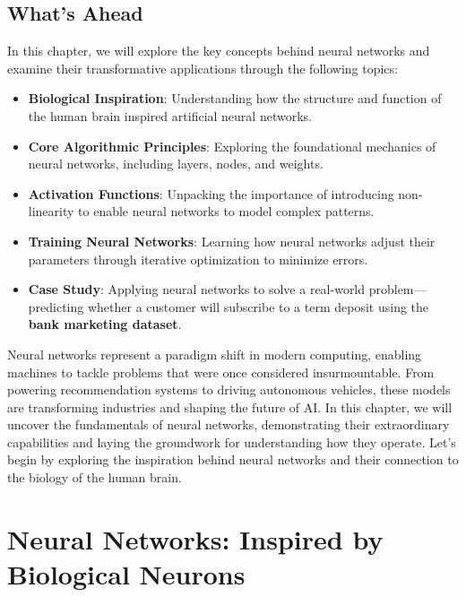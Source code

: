 \documentclass[
]{book}
\providecommand{\tightlist}{%
  \setlength{\itemsep}{0pt}\setlength{\parskip}{0pt}}
\theoremstyle{definition}
\theoremstyle{definition}
\theoremstyle{definition}
\theoremstyle{definition}
\theoremstyle{remark}
\begin{document}
\subsection*{What's Ahead}\label{whats-ahead}

In this chapter, we will explore the key concepts behind neural networks and examine their transformative applications through the following topics:

\begin{itemize}
\tightlist
\item
  \textbf{Biological Inspiration}: Understanding how the structure and function of the human brain inspired artificial neural networks.\\
\item
  \textbf{Core Algorithmic Principles}: Exploring the foundational mechanics of neural networks, including layers, nodes, and weights.\\
\item
  \textbf{Activation Functions}: Unpacking the importance of introducing non-linearity to enable neural networks to model complex patterns.\\
\item
  \textbf{Training Neural Networks}: Learning how neural networks adjust their parameters through iterative optimization to minimize errors.\\
\item
  \textbf{Case Study}: Applying neural networks to solve a real-world problem---predicting whether a customer will subscribe to a term deposit using the \textbf{bank marketing dataset}.
\end{itemize}

Neural networks represent a paradigm shift in modern computing, enabling machines to tackle problems that were once considered insurmountable. From powering recommendation systems to driving autonomous vehicles, these models are transforming industries and shaping the future of AI. In this chapter, we will uncover the fundamentals of neural networks, demonstrating their extraordinary capabilities and laying the groundwork for understanding how they operate. Let's begin by exploring the inspiration behind neural networks and their connection to the biology of the human brain.

\section{Neural Networks: Inspired by Biological Neurons}\label{neural-networks-inspired-by-biological-neurons}
\end{document}
